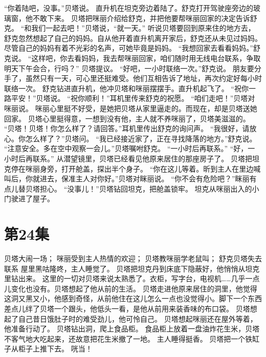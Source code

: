 \documentclass[a4paper,12pt,UTF8,twoside]{ctexbook}
\begin{document}
        “你着陆吧，没事。”贝塔说。 
        直升机在坦克旁边着陆了。舒克打开驾驶座旁边的玻璃窗，他不敢下来。 
        贝塔把咪丽介绍给舒克，并把他要帮咪丽回家的决定告诉舒克。 
        “和我们一起去吧！”贝塔说，“就一天。” 
        听说贝塔要回到原来住的地方去，舒克忽然想起了自己的妈妈。自从他开着直升机离开家后，舒克还从未见过妈妈。尽管自己的妈妈有着不光彩的名声，可她毕竟是妈妈。 
        “我想回家去看看妈妈。”舒克说。 
        “这样吧，你去看妈妈，我去帮咪丽回家，咱们随时用无线电台联系，争取明天下午会合，行吗？” 贝塔提议。 
        “好吧，一小时联络一次。”舒克说。 
        朋友要分手了，虽然只有一天，可心里还挺难受。他们互相告诉了地址，再次约定好每小时联络一次。 
        舒克钻进直升机，他冲贝塔和咪丽摆摆手。直升机起飞了。 
        “祝你一路平安！”贝塔说。 
        “祝你顺利！”耳机里传来舒克的祝愿。 
        “咱们走吧！”贝塔对咪丽说。 
        咪丽心里挺不好受，是她把贝塔从家里逼走的。而现在，却是贝塔送她回家。 
        贝塔心里挺得意，一想到没有他，主人就不养咪丽了，贝塔美滋滋的。 
        “贝塔！贝塔！你怎么样了？请回答。”耳机里传出舒克的询问声。 
        “我很好，请放心。你怎么样了？”贝塔问。 
        “我已经接近家了，正在寻找降落的地方。”舒克说。 
        “注意安全。多在空中观察一会儿。”贝塔嘱咐舒克。 
        “一小时后再联系。” 
        “好，一小时后再联系。” 
        从潜望镜里，贝塔已经看见他原来居住的那座房子了。 
        贝塔把坦克停在咪丽身旁，打开舱盖，探出半个身子。 
        “你在这儿等着。昕到主人在里边喊叫后，你就进去，保准主人对你好。”贝塔对眯丽说。 
        “你不会有危险吧？”眯丽有点儿替贝塔担心。 
        “没事儿！”贝塔钻回坦克，把舱盖锁牢。 
        坦克从咪丽出入的小门驶进了屋子。   \chapter{第24集} 
        贝塔大闹一场； 
        咪丽受到主人热情的欢迎； 
        贝塔教咪丽学老鼠叫； 
        舒克贝塔失去联系   
        屋里黑咕隆咚，主人睡觉了。 
        贝塔把坦克丹到床底下隐蔽好，他悄悄从坦克里钻出来。 
        这里的一切对贝塔来说太熟悉了。衣柜，写字台，电视机……几乎一点儿变化也没有。贝塔想起了他从前的生活。 
        贝塔走进他原来居住的洞里，他觉得这洞又黑又小，他感到奇怪，从前他住在这儿怎么一点也没觉得小。脚下一个东西差点儿绊了贝塔一个跟头，他低头一看，是他从前用来装香味的布口袋。 
        贝塔想起了自己昔日饿肚子时的难受劲儿，他可怜自己。 
        贝塔想起咪丽还在屋外等着，他准备行动了。 
        贝塔钻出洞，爬上食品柜。 
        食品柜上放着一盘油炸花生米，贝塔不客气地大吃起来，还故意把花生米撤了一地。 
        主人睡得挺香。 
        贝塔把一个铁缸子从柜子上推下去。 
        咣当！ 
\end{document}
